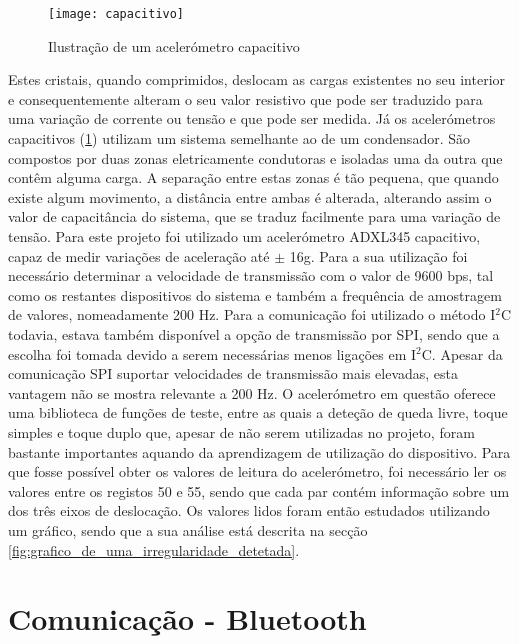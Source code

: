 \begin{figure}[hbtp]
	\centering
	\texttt{[image: capacitivo]}
	\caption[Ilustração de um acelerómetro capacitivo]{Ilustração de um acelerómetro capacitivo \footnotemark}
	\label{fig:capacitivo}
\end{figure}

Estes cristais, quando comprimidos, deslocam as cargas existentes no seu interior e consequentemente alteram o seu valor resistivo que pode ser traduzido para uma variação de corrente ou tensão e que pode ser medida.
Já os acelerómetros capacitivos (\ref{fig:capacitivo}) utilizam um sistema semelhante ao de um condensador.
São compostos por duas zonas eletricamente condutoras e isoladas uma da outra que contêm alguma carga.
A separação entre estas zonas é tão pequena, que quando existe algum movimento, a distância entre ambas é alterada, alterando assim o valor de capacitância do sistema, que se traduz facilmente para uma variação de tensão.
Para este projeto foi utilizado um acelerómetro ADXL345 capacitivo, capaz de medir variações de aceleração até  $\pm$ 16g.
Para a sua utilização foi necessário determinar a velocidade de transmissão com o valor de 9600 bps, tal como os restantes dispositivos do sistema e também a frequência de amostragem de valores, nomeadamente 200 Hz.
Para a comunicação foi utilizado o método I$^2$C todavia, estava também disponível a opção de transmissão por SPI, sendo que a escolha foi tomada devido a serem necessárias menos ligações em I$^2$C.
Apesar da comunicação SPI suportar velocidades de transmissão mais elevadas, esta vantagem não se mostra relevante a 200 Hz.
O acelerómetro em questão oferece uma biblioteca de funções de teste, entre as quais a deteção de queda livre, toque simples e toque duplo que, apesar de não serem utilizadas no projeto, foram bastante importantes aquando da aprendizagem de utilização do dispositivo.
Para que fosse possível obter os valores de leitura do acelerómetro, foi necessário ler os valores entre os registos 50 e 55, sendo que cada par contém informação sobre um dos três eixos de deslocação.
Os valores lidos foram então estudados utilizando um gráfico, sendo que a sua análise está descrita na secção \ref{fig:grafico_de_uma_irregularidade_detetada}.

\section{Comunicação - Bluetooth}
\label{sec:bluetooth}

